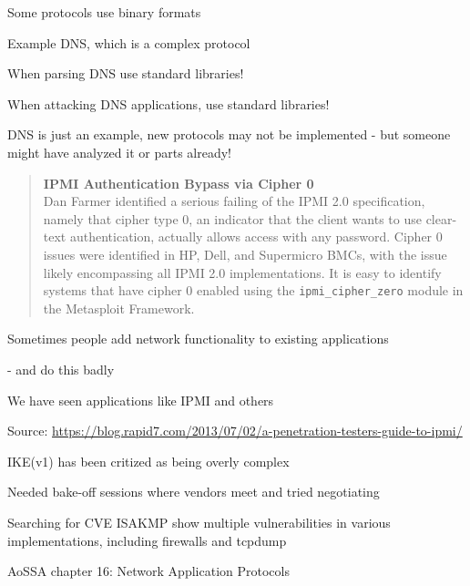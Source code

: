 \documentclass[Screen16to9,17pt]{foils}
\begin{document}

\begin{list2}
\item Some protocols use binary formats
\item Example DNS, which is a complex protocol
\item When parsing DNS use standard libraries!
\item When attacking DNS applications, use standard libraries! \smiley
\item DNS is just an example, new protocols may not be implemented - but someone might have analyzed it or parts already!
\end{list2}




\begin{quote}{\bf
  IPMI Authentication Bypass via Cipher 0}\\
  Dan Farmer identified a serious failing of the IPMI 2.0 specification, namely that cipher type 0, an indicator that the client wants to use clear-text authentication, actually allows access with any password. Cipher 0 issues were identified in HP, Dell, and Supermicro BMCs, with the issue likely encompassing all IPMI 2.0 implementations. It is easy to identify systems that have cipher 0 enabled using the \verb+ipmi_cipher_zero+ module in the Metasploit Framework.
\end{quote}

\begin{list2}
\item Sometimes people add network functionality to existing applications
\item - and do this badly
\item We have seen applications like IPMI and others
\end{list2}

Source: \url{https://blog.rapid7.com/2013/07/02/a-penetration-testers-guide-to-ipmi/}


\begin{list2}
\item IKE(v1) has been critized as being overly complex
\item Needed bake-off sessions where vendors meet and tried negotiating
\item Searching for CVE ISAKMP show multiple vulnerabilities in various implementations, including firewalls and tcpdump
\item AoSSA chapter 16: Network Application Protocols
\end{list2}
\end{document}
